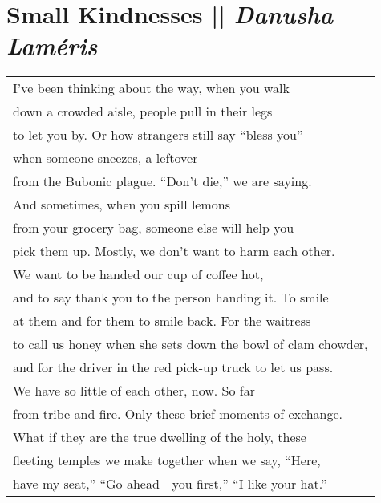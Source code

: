 \section[Small Kindnesses]{Small Kindnesses || \emph{Danusha Laméris} \hspace*{\fill}  \thepage}
\vspace*{1.75cm}
\begin{center}
\begin{tabular}{l}
I’ve been thinking about the way, when you walk\\
down a crowded aisle, people pull in their legs\\
to let you by. Or how strangers still say “bless you”\\
when someone sneezes, a leftover\\
from the Bubonic plague. “Don’t die,” we are saying.\\
And sometimes, when you spill lemons\\
from your grocery bag, someone else will help you\\
pick them up. Mostly, we don’t want to harm each other.\\
We want to be handed our cup of coffee hot,\\
and to say thank you to the person handing it. To smile\\
at them and for them to smile back. For the waitress\\
to call us honey when she sets down the bowl of clam chowder,\\
and for the driver in the red pick-up truck to let us pass.\\
We have so little of each other, now. So far\\
from tribe and fire. Only these brief moments of exchange.\\
What if they are the true dwelling of the holy, these\\
fleeting temples we make together when we say, “Here,\\
have my seat,” “Go ahead—you first,” “I like your hat.”
\end{tabular}
\end{center}